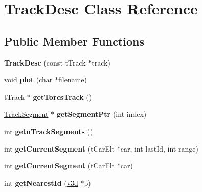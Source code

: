 \hypertarget{class_track_desc}{\section{Track\-Desc Class Reference}
\label{class_track_desc}
}
\subsection*{Public Member Functions}
\begin{DoxyCompactItemize}
\item 
\hypertarget{class_track_desc_ac4dce22721095c2ffe43e3398cafe5c0}{{\bfseries Track\-Desc} (const t\-Track $\ast$track)}\label{class_track_desc_ac4dce22721095c2ffe43e3398cafe5c0}

\item 
\hypertarget{class_track_desc_a83b7ef3a5cb829696602d3c9675dda4e}{void {\bfseries plot} (char $\ast$filename)}\label{class_track_desc_a83b7ef3a5cb829696602d3c9675dda4e}

\item 
\hypertarget{class_track_desc_ad39503f73034910e3d41a5567a360dcf}{t\-Track $\ast$ {\bfseries get\-Torcs\-Track} ()}\label{class_track_desc_ad39503f73034910e3d41a5567a360dcf}

\item 
\hypertarget{class_track_desc_ac473621c43a5a583570cb5637ce1721f}{\hyperlink{class_track_segment}{Track\-Segment} $\ast$ {\bfseries get\-Segment\-Ptr} (int index)}\label{class_track_desc_ac473621c43a5a583570cb5637ce1721f}

\item 
\hypertarget{class_track_desc_af1f0b3669a4201c00708ddb0fbd11c60}{int {\bfseries getn\-Track\-Segments} ()}\label{class_track_desc_af1f0b3669a4201c00708ddb0fbd11c60}

\item 
\hypertarget{class_track_desc_a50331ad708075c5d6c52195565614ba7}{int {\bfseries get\-Current\-Segment} (t\-Car\-Elt $\ast$car, int last\-Id, int range)}\label{class_track_desc_a50331ad708075c5d6c52195565614ba7}

\item 
\hypertarget{class_track_desc_abf40addad9c13c8a0e3551fd4956405a}{int {\bfseries get\-Current\-Segment} (t\-Car\-Elt $\ast$car)}\label{class_track_desc_abf40addad9c13c8a0e3551fd4956405a}

\item 
\hypertarget{class_track_desc_a3a2a0556713f5de1bb054159a7a602ae}{int {\bfseries get\-Nearest\-Id} (\hyperlink{classv3d}{v3d} $\ast$p)}\label{class_track_desc_a3a2a0556713f5de1bb054159a7a602ae}


\end{DoxyCompactItemize}
